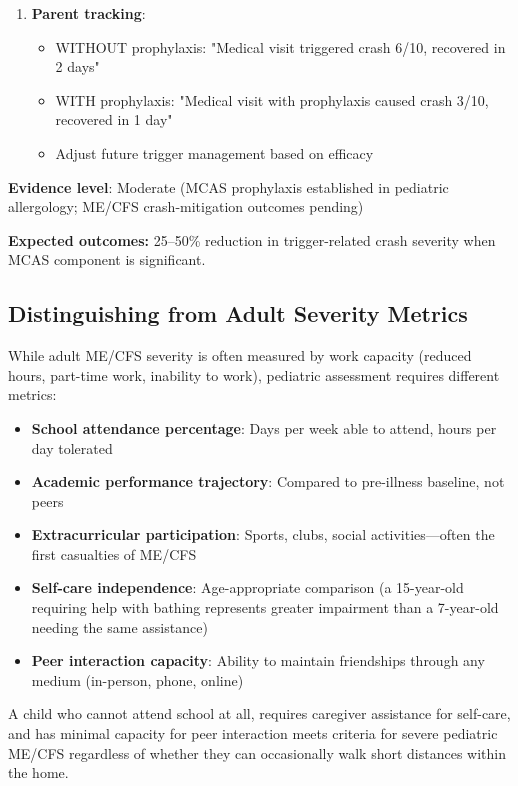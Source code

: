 \begin{recommendation}
\begin{enumerate}
    \item \textbf{Parent tracking}:
    \begin{itemize}
        \item WITHOUT prophylaxis: "Medical visit triggered crash 6/10, recovered in 2 days"
        \item WITH prophylaxis: "Medical visit with prophylaxis caused crash 3/10, recovered in 1 day"
        \item Adjust future trigger management based on efficacy
    \end{itemize}
\end{enumerate}

\textbf{Evidence level}: Moderate (MCAS prophylaxis established in pediatric allergology; ME/CFS crash-mitigation outcomes pending)

\textbf{Expected outcomes:} 25--50\% reduction in trigger-related crash severity when MCAS component is significant.

\end{recommendation}

\subsection{Distinguishing from Adult Severity Metrics}

While adult ME/CFS severity is often measured by work capacity (reduced hours, part-time work, inability to work), pediatric assessment requires different metrics:

\begin{itemize}
    \item \textbf{School attendance percentage}: Days per week able to attend, hours per day tolerated
    \item \textbf{Academic performance trajectory}: Compared to pre-illness baseline, not peers
    \item \textbf{Extracurricular participation}: Sports, clubs, social activities—often the first casualties of ME/CFS
    \item \textbf{Self-care independence}: Age-appropriate comparison (a 15-year-old requiring help with bathing represents greater impairment than a 7-year-old needing the same assistance)
    \item \textbf{Peer interaction capacity}: Ability to maintain friendships through any medium (in-person, phone, online)
\end{itemize}

A child who cannot attend school at all, requires caregiver assistance for self-care, and has minimal capacity for peer interaction meets criteria for severe pediatric ME/CFS regardless of whether they can occasionally walk short distances within the home.

